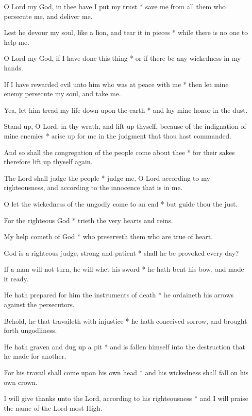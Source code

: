 O Lord my God, in thee have I put my trust * save me from all them who persecute me, and deliver me.

Lest he devour my soul, like a lion, and tear it in pieces * while there is no one to help me.

O Lord my God, if I have done this thing * or if there be any wickedness in my hands.

If I have rewarded evil unto him who was at peace with me * then let mine enemy persecute my soul, and take me.

Yea, let him tread my life down upon the earth * and lay mine honor in the dust.

Stand up, O Lord, in thy wrath, and lift up thyself, because of the indignation of mine enemies * arise up for me in the judgment that thou hast commanded.

And so shall the congregation of the people come about thee * for their sakes therefore lift up thyself again.

The Lord shall judge the people * judge me, O Lord according to my righteousness, and according to the innocence that is in me.

O let the wickedness of the ungodly come to an end * but guide thou the just.

For the righteous God * trieth the very hearts and reins.

My help cometh of God * who preserveth them who are true of heart.

God is a righteous judge, strong and patient * shall he be provoked every day?

If a man will not turn, he will whet his sword * he hath bent his bow, and made it ready.

He hath prepared for him the instruments of death * he ordaineth his arrows against the persecutors.

Behold, he that travaileth with injustice * he hath conceived sorrow, and brought forth ungodliness.

He hath graven and dug up a pit * and is fallen himself into the destruction that he made for another.

For his travail shall come upon his own head * and his wickedness shall fall on his own crown.

I will give thanks unto the Lord, according to his righteousness * and I will praise the name of the Lord most High.